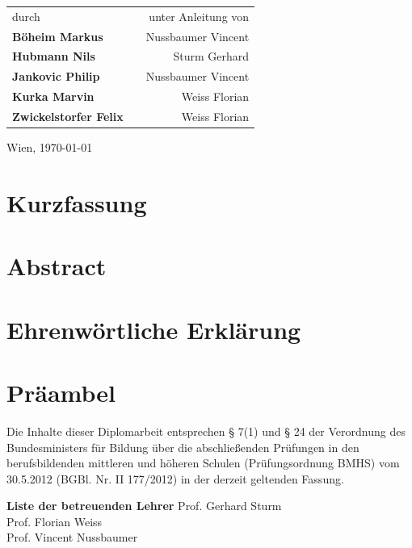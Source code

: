 \documentclass[
    headings=optiontotocandhead,%
    twoside,
    numbers=noenddot,%
    toc=flat, %
    12pt, %
    titlepage, %
    parskip=full, %
    listof=totoc, %
    listof=flat, %
    numbers=noenddot, %
    bibliography=totoc, %
    a4paper,DIV=14,
    BCOR=15mm,
]{scrbook}
\begin{document}
\begin{titlepage}
\begin{center}
{
\renewcommand{\arraystretch}{1.8}
\begin{tabular}{l c r}
durch  & \hfill & unter Anleitung von \\
\textbf{\large{}Böheim Markus} && Nussbaumer Vincent \\
\textbf{\large{}Hubmann Nils} && Sturm Gerhard \\
\textbf{\large{}Jankovic Philip} && Nussbaumer Vincent \\
\textbf{\large{}Kurka Marvin} && Weiss Florian \\
\textbf{\large{}Zwickelstorfer Felix} && Weiss Florian \\
\end{tabular}
}

\vfill

Wien, \today
\par\end{center}

\end{titlepage}

\chapter*{Kurzfassung}


\chapter*{Abstract}


\chapter*{Ehrenwörtliche Erklärung}


\chapter*{Präambel}
Die Inhalte dieser Diplomarbeit entsprechen § 7(1) und § 24 der Verordnung des Bundesministers für Bildung über die abschließenden Prüfungen in den berufsbildenden mittleren und höheren Schulen (Prüfungsordnung BMHS) vom 30.5.2012 (BGBl. Nr. II 177/2012) in der derzeit geltenden Fassung.

\textbf{Liste der betreuenden Lehrer}
Prof. Gerhard Sturm \\ %
Prof. Florian Weiss \\
Prof. Vincent Nussbaumer \\
\end{document}
